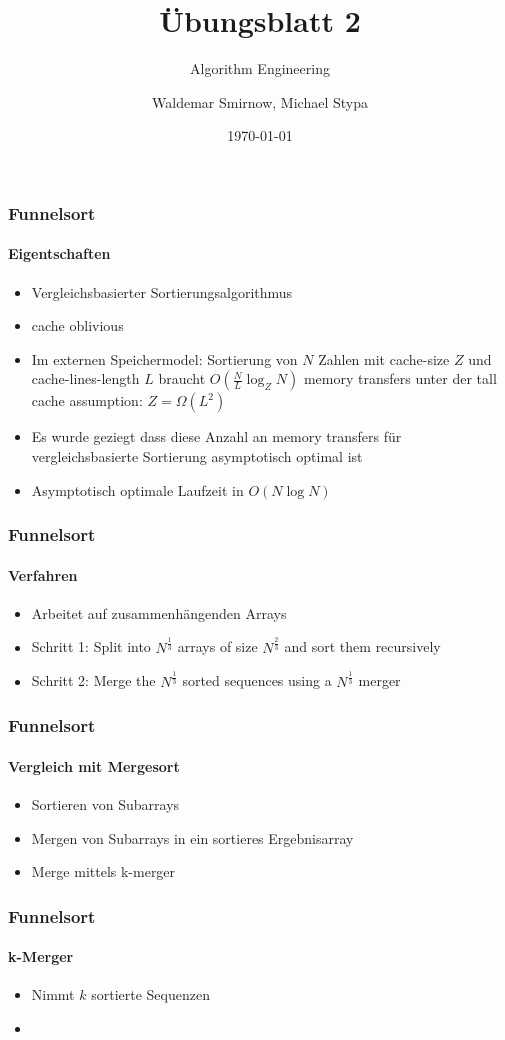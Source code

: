 \documentclass{beamer}
\title{Übungsblatt 2}
\subtitle{Algorithm Engineering}
\author{Waldemar Smirnow, Michael Stypa}
\institute{Universität Osnabrück}
\date{\today}
\begin{document}
\begin{frame}
    \titlepage
\end{frame}

\begin{frame}
  \frametitle{Funnelsort}
  \framesubtitle{Eigentschaften}
  \begin{itemize}
    \item Vergleichsbasierter Sortierungsalgorithmus
    \item cache oblivious
    \item Im externen Speichermodel: Sortierung von $N$ Zahlen
      mit cache-size $Z$ und cache-lines-length $L$
      braucht $O(\frac{N}{L}\log_Z{N})$ memory transfers
      unter der tall cache assumption: $Z = \Omega(L^2)$
    \item Es wurde geziegt dass diese Anzahl an memory transfers
      für vergleichsbasierte Sortierung asymptotisch optimal ist
    \item Asymptotisch optimale Laufzeit in $O(N\log{N})$
  \end{itemize}
\end{frame}

\begin{frame}
  \frametitle{Funnelsort}
  \framesubtitle{Verfahren}
  \begin{itemize}
    \item Arbeitet auf zusammenhängenden Arrays
    \item Schritt 1: Split into $N^{\frac{1}{3}}$ arrays
      of size $N^{\frac{2}{3}}$ and sort them recursively
    \item Schritt 2: Merge the $N^{\frac{1}{3}}$ sorted sequences
      using a $N^{\frac{1}{3}}$ merger
  \end{itemize}
\end{frame}

\begin{frame}
  \frametitle{Funnelsort}
  \framesubtitle{Vergleich mit Mergesort}
  \begin{itemize}
    \item Sortieren von Subarrays
    \item Mergen von Subarrays in ein sortieres Ergebnisarray
  \end{itemize}
  \begin{itemize}
    \item Merge mittels k-merger
  \end{itemize}
\end{frame}

\begin{frame}
  \frametitle{Funnelsort}
  \framesubtitle{k-Merger}
  \begin{itemize}
    \item Nimmt $k$ sortierte Sequenzen
    \item 
  \end{itemize}
\end{frame}
\end{document}

